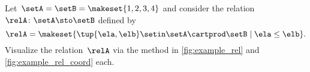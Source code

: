 \vfill
\begin{gradedexercise}
    \label{ex:visualize-leq-relation}
    Let~$\setA = \setB = \makeset{1, 2, 3, 4 }$ and consider the relation~$\relA \colon \setA \sto  \setB$ defined by
    \begin{equation}
        \relA = \makeset{ \tup{\ela,\elb} \setin \setA \cartprod \setB \mid \ela \leq \elb }.
    \end{equation}
    Visualize the relation~$\relA$ via the method in \cref{fig:example_rel} and \cref{fig:example_rel_coord} each.
\end{gradedexercise}

